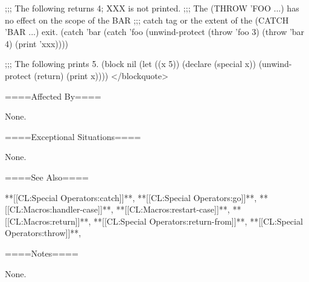 ;;; The following returns 4; XXX is not printed. ;;; The (THROW 'FOO ...) has no effect on the scope of the BAR ;;; catch tag or the extent of the (CATCH 'BAR ...) exit. (catch 'bar (catch 'foo (unwind-protect (throw 'foo 3) (throw 'bar 4) (print 'xxx))))


;;; The following prints 5. (block nil (let ((x 5)) (declare (special x)) (unwind-protect (return) (print x)))) </blockquote>


====Affected By====

None.

====Exceptional Situations====

None.

====See Also====

**[[CL:Special Operators:catch]]**, **[[CL:Special Operators:go]]**, **[[CL:Macros:handler-case]]**, **[[CL:Macros:restart-case]]**, **[[CL:Macros:return]]**, **[[CL:Special Operators:return-from]]**, **[[CL:Special Operators:throw]]**, {\secref\Evaluation}

====Notes====

None.

 
